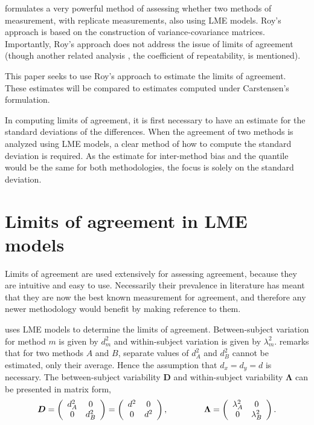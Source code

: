 \documentclass[12pt, a4paper]{report}
\theoremstyle{plain}
\theoremstyle{definition}
\theoremstyle{remark}
\begin{document}
		\citet{ARoy2009} formulates a very powerful method of assessing whether two methods of measurement, with replicate measurements, also using LME models. Roy's approach is based on the construction of variance-covariance matrices.
		Importantly, Roy's approach does not address the issue of limits of agreement (though another related analysis , the coefficient of repeatability, is mentioned).
		
		This paper seeks to use Roy's approach to estimate the limits of agreement. These estimates will be compared to estimates computed under Carstensen's formulation.
		
		In computing limits of agreement, it is first necessary to have an estimate for the standard deviations of the differences. When the agreement of two methods is analyzed using LME models, a clear method of how to compute the standard deviation is required. As the estimate for inter-method bias and the quantile would be the same for both methodologies, the focus is solely on the standard deviation.
	\section{Limits of agreement in LME models}
	
	Limits of agreement are used extensively for assessing agreement, because they are intuitive and easy to use.
	Necessarily their prevalence in literature has meant that they are now the best known measurement for agreement, and therefore any newer methodology would benefit by making reference to them.
	
	\citet{BXC2008} uses LME models to determine the limits of agreement. Between-subject variation for method $m$ is given by $d^2_{m}$ and within-subject variation is given by $\lambda^2_{m}$.  \citet{BXC2008} remarks that for two methods $A$ and $B$, separate values of $d^2_{A}$ and $d^2_{B}$ cannot be estimated, only their average. Hence the assumption that $d_{x}= d_{y}= d$ is necessary. The between-subject variability $\boldsymbol{D}$ and within-subject variability $\boldsymbol{\Lambda}$ can be presented in matrix form,\[
	\boldsymbol{D} = \left(%
	\begin{array}{cc}
	d^2_{A}& 0 \\
	0 & d^2_{B} \\
	\end{array}%
	\right)=\left(%
	\begin{array}{cc}
	d^2& 0 \\
	0 & d^2\\
	\end{array}%
	\right),
	\hspace{1.5cm}
	\boldsymbol{\Lambda} = \left(%
	\begin{array}{cc}
	\lambda^2_{A}& 0 \\
	0 & \lambda^2_{B} \\
	\end{array}%
	\right).
	\]
	
\end{document}
